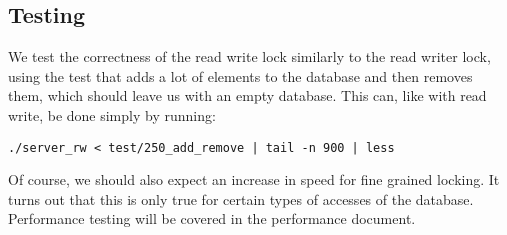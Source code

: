 \documentclass[paper=a4, fontsize=11pt]{scrartcl} %
\numberwithin{equation}{section} %
\numberwithin{figure}{section} %
\numberwithin{table}{section} %
\begin{document}
\subsection{Testing}
We test the correctness of the read write lock similarly to the read writer lock, using the test that adds a lot of elements to the database and then removes them, which should leave us with an empty database. This can, like with read write, be done simply by running:

\begin{verbatim}
./server_rw < test/250_add_remove | tail -n 900 | less
\end{verbatim}

Of course, we should also expect an increase in speed for fine grained locking.  It turns out that this is only true for certain types of accesses of the database. Performance testing will be covered in the performance document.
\end{document}
